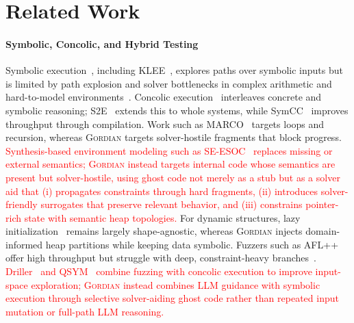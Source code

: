 \documentclass[acmsmall]{acmart}
\newcommand{\rev}[1]{\textcolor{red}{#1}}
\newcommand{\rev}[1]{#1}
\newcommand{\projName}{\textsc{Gordian}\xspace}
\theoremstyle{definition}
\begin{document}


\section{Related Work}

\paragraph*{Symbolic, Concolic, and Hybrid Testing} Symbolic execution~\cite{king1976symbolic}, including KLEE~\cite{klee}, explores paths over symbolic inputs but is limited by path explosion and solver bottlenecks in complex arithmetic and hard-to-model environments~\cite{env_modeling,autobug}. Concolic execution~\cite{dart} interleaves concrete and symbolic reasoning; S2E~\cite{s2e} extends this to whole systems, while SymCC~\cite{symcc} improves throughput through compilation. Work such as MARCO~\cite{hu2024marco} targets loops and recursion, whereas \projName{} targets solver-hostile fragments that block progress. \rev{Synthesis-based environment modeling such as SE-ESOC~\cite{mechtaev2018symbolic} replaces missing or external semantics; \projName{} instead targets internal code whose semantics are present but solver-hostile, using ghost code not merely as a stub but as a solver aid that (i) propagates constraints through hard fragments, (ii) introduces solver-friendly surrogates that preserve relevant behavior, and (iii) constrains pointer-rich state with semantic heap topologies.} For dynamic structures, lazy initialization~\cite{visser2004test} remains largely shape-agnostic, whereas \projName{} injects domain-informed heap partitions while keeping data symbolic. Fuzzers such as AFL++~\cite{aflpp} offer high throughput but struggle with deep, constraint-heavy branches~\cite{manes_fuzzing_survey}. \rev{Driller~\cite{driller} and QSYM~\cite{qsym} combine fuzzing with concolic execution to improve input-space exploration; \projName{} instead combines LLM guidance with symbolic execution through selective solver-aiding ghost code rather than repeated input mutation or full-path LLM reasoning.}
\end{document}

